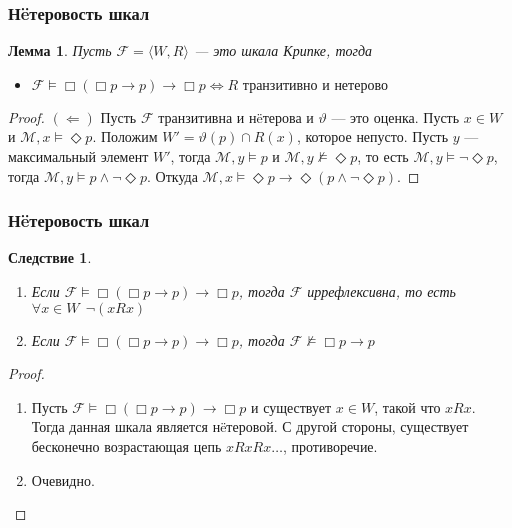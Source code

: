 \documentclass[pdf,utf8,russian,aspectratio=169]{beamer}
\newtheorem{lem}{Лемма}
\newtheorem{col}{Следствие}
\begin{document}
\begin{frame}
  \frametitle{Н\"{e}теровость шкал}

  \begin{lem}
    Пусть $\mathcal{F} = \langle W, R \rangle$ --- это шкала Крипке, тогда

  \begin{itemize}
    \item $\mathcal{F} \models \Box (\Box p \to p) \to \Box p \Leftrightarrow R \text{ транзитивно и н\"{е}терово}$
  \end{itemize}
\end{lem}

\begin{proof}
  $(\Leftarrow)$ Пусть $\mathcal{F}$ транзитивна и н\"{e}терова и $\vartheta$ --- это оценка. Пусть $x \in W$ и $\mathcal{M}, x \models \Diamond p$.
  Положим $W' = \vartheta(p) \cap R(x)$, которое непусто. Пусть $y$ --- максимальный элемент $W'$, тогда $\mathcal{M}, y \models p$ и
  $\mathcal{M}, y \not\models \Diamond p$, то есть $\mathcal{M}, y \models \neg \Diamond p$, тогда $\mathcal{M}, y \models p \land \neg \Diamond p$.
  Откуда $\mathcal{M}, x \models \Diamond p \to \Diamond (p \land \neg \Diamond p)$.
\end{proof}
\end{frame}

\begin{frame}
  \frametitle{Н\"{e}теровость шкал}
  \begin{col}
    \begin{enumerate}
    \item Если $\mathcal{F} \models \Box (\Box p \to p) \to \Box p$, тогда $\mathcal{F}$ иррефлексивна, то есть $\forall x \in W \:\: \neg (x R x)$
    \item Если $\mathcal{F} \models \Box (\Box p \to p) \to \Box p$, тогда $\mathcal{F} \not\models \Box p \to p$
  \end{enumerate}
  \end{col}

  \begin{proof}
    \begin{enumerate}
    \item Пусть $\mathcal{F} \models \Box (\Box p \to p) \to \Box p$ и существует $x \in W$, такой что $x R x$. Тогда данная шкала является н\"{e}теровой.
    С другой стороны, существует бесконечно возрастающая цепь $x R x R x \dots$, противоречие.
    \item Очевидно.
  \end{enumerate}
  \end{proof}
\end{frame}
\end{document}
